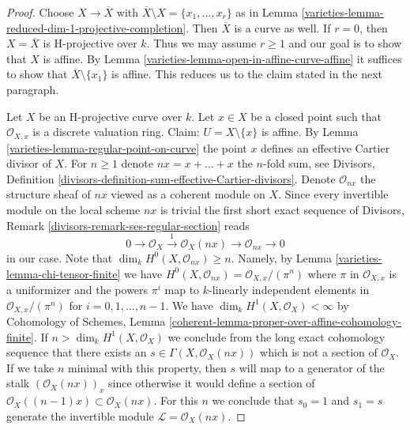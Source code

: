 \begin{proof}

Choose $X \to \overline{X}$ with
$\overline{X} \setminus X = \{x_1, \ldots, x_r\}$ as in
Lemma \ref{varieties-lemma-reduced-dim-1-projective-completion}.
Then $\overline{X}$ is a curve as well.
If $r = 0$, then $X = \overline{X}$ is H-projective over $k$.
Thus we may assume $r \geq 1$ and our goal is to show that
$X$ is affine. By Lemma \ref{varieties-lemma-open-in-affine-curve-affine}
it suffices to show that $\overline{X} \setminus \{x_1\}$ is affine.
This reduces us to the claim stated in the next paragraph.

\medskip\noindent
Let $X$ be an H-projective curve over $k$. Let $x \in X$ be a closed point
such that $\mathcal{O}_{X, x}$ is a discrete valuation ring. Claim:
$U = X \setminus \{x\}$ is affine. By Lemma \ref{varieties-lemma-regular-point-on-curve}
the point $x$ defines an effective Cartier divisor of $X$.
For $n \geq 1$ denote $nx = x + \ldots + x$ the $n$-fold sum, see
Divisors, Definition \ref{divisors-definition-sum-effective-Cartier-divisors}.
Denote $\mathcal{O}_{nx}$ the structure sheaf of $nx$ viewed as a
coherent module on $X$.
Since every invertible module on the local scheme $nx$ is trivial
the first short exact sequence of
Divisors, Remark \ref{divisors-remark-ses-regular-section}
reads
$$
0 \to \mathcal{O}_X
\xrightarrow{1} \mathcal{O}_X(nx) \to \mathcal{O}_{nx} \to 0
$$
in our case. Note that $\dim_k H^0(X, \mathcal{O}_{nx}) \geq n$.
Namely, by Lemma \ref{varieties-lemma-chi-tensor-finite} we have
$H^0(X, \mathcal{O}_{nx}) = \mathcal{O}_{X, x}/(\pi^n)$ where $\pi$ in
$\mathcal{O}_{X, x}$ is a uniformizer and the powers $\pi^i$ map to
$k$-linearly independent elements in $\mathcal{O}_{X, x}/(\pi^n)$
for $i = 0, 1, \ldots, n - 1$. We have $\dim_k H^1(X, \mathcal{O}_X) < \infty$
by Cohomology of Schemes, Lemma
\ref{coherent-lemma-proper-over-affine-cohomology-finite}.
If $n > \dim_k H^1(X, \mathcal{O}_X)$
we conclude from the long exact cohomology sequence
that there exists an $s \in \Gamma(X, \mathcal{O}_X(nx))$
which is not a section of $\mathcal{O}_X$.
If we take $n$ minimal with this property, then $s$ will
map to a generator of the stalk
$\left(\mathcal{O}_X(nx)\right)_x$ since otherwise it would
define a section of $\mathcal{O}_X((n - 1)x) \subset \mathcal{O}_X(nx)$.
For this $n$ we conclude that $s_0 = 1$ and $s_1 = s$
generate the invertible module $\mathcal{L} = \mathcal{O}_X(nx)$.


\end{proof}
